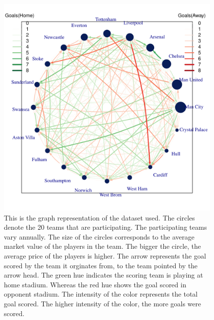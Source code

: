 \documentclass[12pt,a4paper,twoside,openany]{book}\usepackage[]{graphicx}\usepackage[]{color}
\makeatletter
\def\maxwidth{ %
  \ifdim\Gin@nat@width>\linewidth
    \linewidth
  \else
    \Gin@nat@width
  \fi
}
\newenvironment{knitrout}{}{} %
\makeatother
\begin{document}
\begin{figure}[H]
\begin{knitrout}
\color{fgcolor}

{\centering \includegraphics[width=\maxwidth]{figure/unnamed-chunk-5-1} 

}



\end{knitrout}
\caption [Graph Representation of a Football League]{This is the graph representation of the dataset used. The circles denote the 20 teams that are participating. The participating teams vary annually. The size of the circles corresponds to the average market value of the players in the team. The bigger the circle, the average price of the players is higher. The arrow represents the goal scored by the team it orginates from, to the team pointed by the arrow head. The green hue indicates the scoring team is playing at home stadium. Whereas the red hue shows the goal scored in opponent stadium. The intensity of the color represents the total goal scored. The higher intensity of the color, the more goals were scored.}
\label{fig: EPL}
\end{figure}


\end{document}
